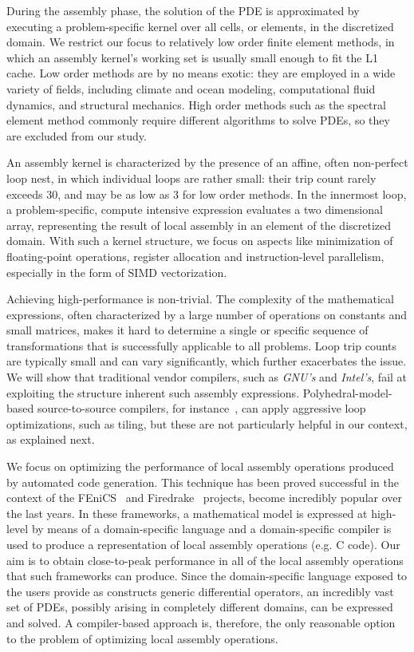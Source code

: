 During the assembly phase, the solution of the PDE is approximated by executing a problem-specific kernel over all cells, or elements, in the discretized domain. We restrict our focus to relatively low order finite element methods, in which an assembly kernel's working set is usually small enough to fit the L1 cache. Low order methods are by no means exotic: they are employed in a wide variety of fields, including climate and ocean modeling, computational fluid dynamics, and structural mechanics. High order methods such as the spectral element method \cite{SPENCER} commonly require different algorithms to solve PDEs, so they are excluded from our study.

An assembly kernel is characterized by the presence of an affine, often non-perfect loop nest, in which individual loops are rather small: their trip count rarely exceeds 30, and may be as low as 3 for low order methods. In the innermost loop, a problem-specific, compute intensive expression evaluates a two dimensional array, representing the result of local assembly in an element of the discretized domain. With such a kernel structure, we focus on aspects like minimization of floating-point operations, register allocation and instruction-level parallelism, especially in the form of SIMD vectorization.

Achieving high-performance is non-trivial. The complexity of the mathematical expressions, often characterized by a large number of operations on constants and small matrices, makes it hard to determine a single or specific sequence of transformations that is successfully applicable to all problems. Loop trip counts are typically small and can vary significantly, which further exacerbates the issue. We will show that traditional vendor compilers, such as \emph{GNU's} and \emph{Intel's}, fail at exploiting the structure inherent such assembly expressions. Polyhedral-model-based source-to-source compilers, for instance~\cite{PLUTO}, can apply aggressive loop optimizations, such as tiling, but these are not particularly helpful in our context, as explained next. 

We focus on optimizing the performance of local assembly operations produced by automated code generation. This technique has been proved successful in the context of the FEniCS~\cite{Fenics} and Firedrake~\cite{firedrake-code} projects, become incredibly popular over the last years. In these frameworks, a mathematical model is expressed at high-level by means of a domain-specific language and a domain-specific compiler is used to produce a representation of local assembly operations (e.g. C code). Our aim is to obtain close-to-peak performance in all of the local assembly operations that such frameworks can produce. Since the domain-specific language exposed to the users provide as constructs generic differential operators, an incredibly vast set of PDEs, possibly arising in completely different domains, can be expressed and solved. A compiler-based approach is, therefore, the only reasonable option to the problem of optimizing local assembly operations. 

